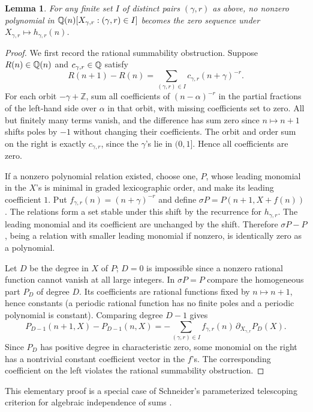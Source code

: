 \documentclass[11pt,a4paper]{article}
\newtheorem{SourceRbiHlemma}{Lemma}
\begin{document}
\begin{SourceRbiHlemma}\label{R18H:ind}
For any finite set $I$ of distinct pairs $(\gamma,r)$ as above, no nonzero
polynomial in $\mathbb Q(n)[X_{\gamma,r}:(\gamma,r)\in I]$ becomes the zero sequence
under $X_{\gamma,r}\mapsto h_{\gamma,r}(n)$.
\end{SourceRbiHlemma}

\begin{proof}
We first record the rational summability obstruction. Suppose
$R(n)\in\mathbb Q(n)$ and $c_{\gamma,r}\in\mathbb Q$ satisfy
\[
R(n+1)-R(n)=\sum_{(\gamma,r)\in I}c_{\gamma,r}(n+\gamma)^{-r}.
\]
For each orbit $-\gamma+\mathbb Z$, sum all coefficients of
$(n-\alpha)^{-r}$ in the partial fractions of the left-hand side over
$\alpha$ in that orbit, with missing coefficients set to zero. All but
finitely many terms vanish, and the difference has sum zero since
$n\mapsto n+1$ shifts poles by $-1$ without changing their coefficients.
The orbit and order sum on the right is exactly $c_{\gamma,r}$, since
the $\gamma$'s lie in $(0,1]$. Hence all coefficients are zero.

If a nonzero polynomial relation existed, choose one, $P$, whose leading
monomial in the $X$'s is minimal in graded lexicographic order, and make
its leading coefficient $1$. Put $f_{\gamma,r}(n)=(n+\gamma)^{-r}$
and define $\sigma P=P(n+1,X+f(n))$. The relations form a set stable
under this shift by the recurrence for $h_{\gamma,r}$. The leading
monomial and its coefficient are unchanged by the shift. Therefore
$\sigma P-P$, being a relation with smaller leading monomial if nonzero,
is identically zero as a polynomial.

Let $D$ be the degree in $X$ of $P$; $D=0$ is impossible since a nonzero
rational function cannot vanish at all large integers. In
$\sigma P=P$ compare the homogeneous part $P_D$ of degree $D$. Its
coefficients are rational functions fixed by $n\mapsto n+1$, hence
constants (a periodic rational function has no finite poles and a
periodic polynomial is constant). Comparing degree $D-1$ gives
\[
P_{D-1}(n+1,X)-P_{D-1}(n,X)
  =-\sum_{(\gamma,r)\in I}f_{\gamma,r}(n)\,\partial_{X_{\gamma,r}}P_D(X).
\]
Since $P_D$ has positive degree in characteristic zero, some monomial on
the right has a nontrivial constant coefficient vector in the $f$'s.
The corresponding coefficient on the left violates the rational
summability obstruction.
\end{proof}

This elementary proof is a special case of Schneider's parameterized
telescoping criterion for algebraic independence of sums \cite{R18H:schneider}.
\end{document}
